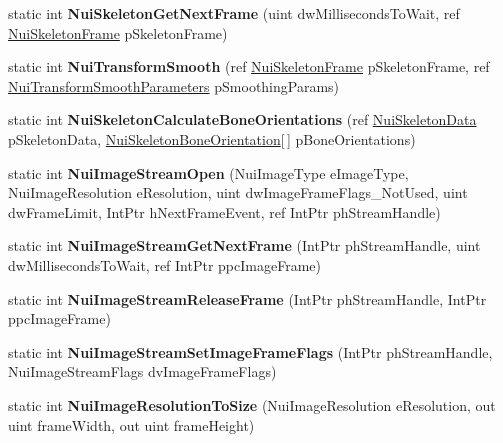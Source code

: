 \begin{DoxyCompactItemize}
static int {\bfseries Nui\+Skeleton\+Get\+Next\+Frame} (uint dw\+Milliseconds\+To\+Wait, ref \mbox{\hyperlink{struct_kinect_wrapper_1_1_nui_skeleton_frame}{Nui\+Skeleton\+Frame}} p\+Skeleton\+Frame)
\item 
\mbox{\label{class_kinect_wrapper_ab6c258db8ad4d3927af93397450ac30f}} 
static int {\bfseries Nui\+Transform\+Smooth} (ref \mbox{\hyperlink{struct_kinect_wrapper_1_1_nui_skeleton_frame}{Nui\+Skeleton\+Frame}} p\+Skeleton\+Frame, ref \mbox{\hyperlink{struct_kinect_wrapper_1_1_nui_transform_smooth_parameters}{Nui\+Transform\+Smooth\+Parameters}} p\+Smoothing\+Params)
\item 
\mbox{\label{class_kinect_wrapper_a6aa2e92ea435aff8b2b529f9af865a17}} 
static int {\bfseries Nui\+Skeleton\+Calculate\+Bone\+Orientations} (ref \mbox{\hyperlink{struct_kinect_wrapper_1_1_nui_skeleton_data}{Nui\+Skeleton\+Data}} p\+Skeleton\+Data, \mbox{\hyperlink{struct_kinect_wrapper_1_1_nui_skeleton_bone_orientation}{Nui\+Skeleton\+Bone\+Orientation}}\mbox{[}$\,$\mbox{]} p\+Bone\+Orientations)
\item 
\mbox{\label{class_kinect_wrapper_aa3d8db2048200771211ebf49f2e6ca47}} 
static int {\bfseries Nui\+Image\+Stream\+Open} (Nui\+Image\+Type e\+Image\+Type, Nui\+Image\+Resolution e\+Resolution, uint dw\+Image\+Frame\+Flags\+\_\+\+Not\+Used, uint dw\+Frame\+Limit, Int\+Ptr h\+Next\+Frame\+Event, ref Int\+Ptr ph\+Stream\+Handle)
\item 
\mbox{\label{class_kinect_wrapper_a85917a9af5cac4b8ea42756bb0f58a1a}} 
static int {\bfseries Nui\+Image\+Stream\+Get\+Next\+Frame} (Int\+Ptr ph\+Stream\+Handle, uint dw\+Milliseconds\+To\+Wait, ref Int\+Ptr ppc\+Image\+Frame)
\item 
\mbox{\label{class_kinect_wrapper_a881c04a93c8760da24c3e0d989675f7d}} 
static int {\bfseries Nui\+Image\+Stream\+Release\+Frame} (Int\+Ptr ph\+Stream\+Handle, Int\+Ptr ppc\+Image\+Frame)
\item 
\mbox{\label{class_kinect_wrapper_aa781107969acc314e12407f42fd9a886}} 
static int {\bfseries Nui\+Image\+Stream\+Set\+Image\+Frame\+Flags} (Int\+Ptr ph\+Stream\+Handle, Nui\+Image\+Stream\+Flags dv\+Image\+Frame\+Flags)
\item 
\mbox{\label{class_kinect_wrapper_a387a5aef9e0ba9490e7c953acd662bf4}} 
static int {\bfseries Nui\+Image\+Resolution\+To\+Size} (Nui\+Image\+Resolution e\+Resolution, out uint frame\+Width, out uint frame\+Height)
\end{DoxyCompactItemize}
